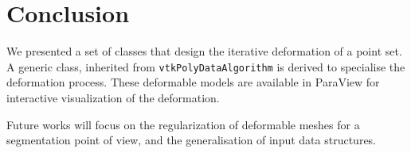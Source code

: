 \documentclass{InsightArticle}
\begin{document}
\section{Conclusion}
%
We presented a set of classes that design the iterative deformation of a point
set. A generic class, inherited from \verb!vtkPolyDataAlgorithm! is derived to
specialise the deformation process. These deformable models are available in 
ParaView for interactive visualization of the deformation.

Future works will focus on the regularization of deformable meshes for a 
segmentation point of view, and the generalisation of input data structures.
%
\appendix

%
%



\end{document}
